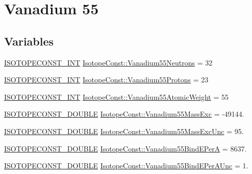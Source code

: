 \hypertarget{group___isotope_const-_vanadium-_v55}{}\section{Vanadium 55}
\label{group___isotope_const-_vanadium-_v55}
\subsection*{Variables}
\begin{DoxyCompactItemize}
\item 
\mbox{\hyperlink{group___isotope_const-_macros_ga5f18360b3e99483a35c32d789e62621c}{I\+S\+O\+T\+O\+P\+E\+C\+O\+N\+S\+T\+\_\+\+I\+NT}} \mbox{\hyperlink{group___isotope_const-_vanadium-_v55_ga9cda29a4d1d2332bf82f945bdc2d6fd6}{Isotope\+Const\+::\+Vanadium55\+Neutrons}} = 32
\item 
\mbox{\hyperlink{group___isotope_const-_macros_ga5f18360b3e99483a35c32d789e62621c}{I\+S\+O\+T\+O\+P\+E\+C\+O\+N\+S\+T\+\_\+\+I\+NT}} \mbox{\hyperlink{group___isotope_const-_vanadium-_v55_ga7186ea8e5883a46f5d3f7a33b96314bb}{Isotope\+Const\+::\+Vanadium55\+Protons}} = 23
\item 
\mbox{\hyperlink{group___isotope_const-_macros_ga5f18360b3e99483a35c32d789e62621c}{I\+S\+O\+T\+O\+P\+E\+C\+O\+N\+S\+T\+\_\+\+I\+NT}} \mbox{\hyperlink{group___isotope_const-_vanadium-_v55_ga14321924dda57093cd8f4671785ef71e}{Isotope\+Const\+::\+Vanadium55\+Atomic\+Weight}} = 55
\item 
\mbox{\hyperlink{group___isotope_const-_macros_ga8f45a7272ce02c0b4c65c44636ed719a}{I\+S\+O\+T\+O\+P\+E\+C\+O\+N\+S\+T\+\_\+\+D\+O\+U\+B\+LE}} \mbox{\hyperlink{group___isotope_const-_vanadium-_v55_ga80cb4a4ef76ae078788e34b9fd4fdcd8}{Isotope\+Const\+::\+Vanadium55\+Mass\+Exc}} = -\/49144.
\item 
\mbox{\hyperlink{group___isotope_const-_macros_ga8f45a7272ce02c0b4c65c44636ed719a}{I\+S\+O\+T\+O\+P\+E\+C\+O\+N\+S\+T\+\_\+\+D\+O\+U\+B\+LE}} \mbox{\hyperlink{group___isotope_const-_vanadium-_v55_ga90f11783581a1e657278c713677a82c4}{Isotope\+Const\+::\+Vanadium55\+Mass\+Exc\+Unc}} = 95.
\item 
\mbox{\hyperlink{group___isotope_const-_macros_ga8f45a7272ce02c0b4c65c44636ed719a}{I\+S\+O\+T\+O\+P\+E\+C\+O\+N\+S\+T\+\_\+\+D\+O\+U\+B\+LE}} \mbox{\hyperlink{group___isotope_const-_vanadium-_v55_ga885a343e93c51ed903350b043bb02c81}{Isotope\+Const\+::\+Vanadium55\+Bind\+E\+PerA}} = 8637.
\item 
\mbox{\hyperlink{group___isotope_const-_macros_ga8f45a7272ce02c0b4c65c44636ed719a}{I\+S\+O\+T\+O\+P\+E\+C\+O\+N\+S\+T\+\_\+\+D\+O\+U\+B\+LE}} \mbox{\hyperlink{group___isotope_const-_vanadium-_v55_ga6f0b811180947d846ac16b1306de9450}{Isotope\+Const\+::\+Vanadium55\+Bind\+E\+Per\+A\+Unc}} = 1.

\end{DoxyCompactItemize}
